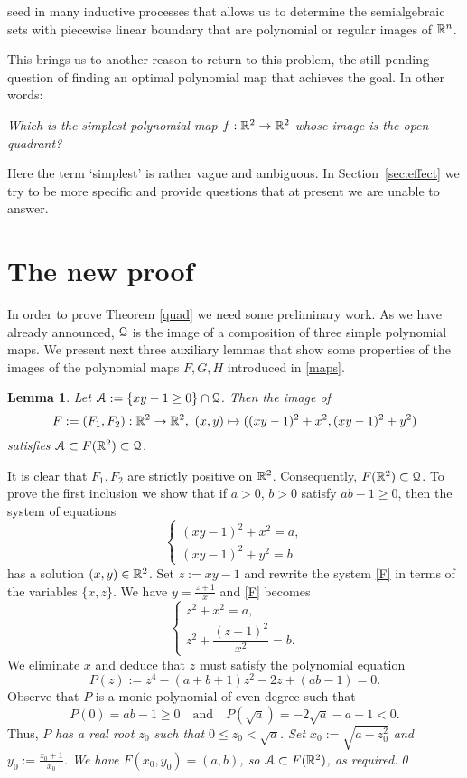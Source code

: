 \documentclass[1p]{elsarticle}
\newtheorem{lem}[thm]{Lemma}
\newcommand{\Qq}{{\EuScript Q}}
\newcommand{\Aa}{{\EuScript A}}
\begin{document}
seed in many inductive processes that allows us to determine the semialgebraic sets with piecewise linear boundary that are polynomial or regular images of ${\mathbb R}^n$. 

This brings us to another reason to return to this problem, the still pending question of finding an optimal polynomial map that achieves the goal. In other words: 
\begin{center}
\em Which is the simplest polynomial map $f:{\mathbb R}^2\to{\mathbb R}^2$ whose image is the open quadrant?\em 
\end{center}
Here the term `simplest' is rather vague and ambiguous. In Section~\ref{sec:effect} we try to be more specific and provide questions that at present we are unable to answer.

\section{The new proof}
In order to prove Theorem \ref{quad} we need some preliminary work. As we have already announced, $\Qq$ is the image of a composition of three simple polynomial maps. We present next three auxiliary lemmas that show some properties of the images of the polynomial maps $F,G,H$ introduced in \eqref{maps}.

\begin{lem}\label{step1}
Let $\Aa:=\{xy-1\ge0\}\cap\Qq$. Then the image of
$$
F:=(F_1,F_2):\R^2\to\R^2,\ (x,y)\mapsto((xy-1)^2+x^2,(xy-1)^2+y^2)
$$
satisfies $\Aa\subset F(\R^2)\subset\Qq$.
\end{lem}
\begin{pf}
It is clear that $F_1,F_2$ are strictly positive on ${\mathbb R}^2$. Consequently, $F(\R^2)\subset\Qq$. To prove the first inclusion we show that if $a>0$, $b>0$ satisfy $ab-1\ge 0$, then the system of equations
\begin{equation}\label{F}
\begin{cases}
(xy-1)^2+x^2=a,\\
(xy-1)^2+y^2=b
\end{cases}
\end{equation}
has a solution $(x,y)\in{\mathbb R}^2$. Set $z:=xy-1$ and rewrite the system \eqref{F} in terms of the variables $\{x,z\}$. We have $y=\tfrac{z+1}{x}$ and \eqref{F} becomes
$$
\begin{cases}
z^2+x^2=a,\\
z^2+\dfrac{(z+1)^2}{x^2}=b.
\end{cases}
$$
We eliminate $x$ and deduce that $z$ must satisfy the polynomial equation
$$
P(z):=z^4-(a+b+1)z^2-2z+(ab-1)=0.
$$
Observe that $P$ is a monic polynomial of even degree such that 
$$
P(0)=ab-1\ge0\quad\text{and}\quad P(\sqrt{a})=-2\sqrt{a}-a-1<0.
$$ 
Thus, $P$ \em has a real root $z_0$ such that $0\le z_0<\sqrt{a}$\em. Set $x_0:=\sqrt{a-z_0^2}$ and $y_0:=\tfrac{z_0+1}{x_0}$. We have $F(x_0,y_0)=(a,b)$, so $\Aa\subset F(\R^2)$, as required.\qed
\end{pf}
\end{document}
